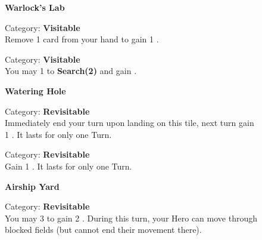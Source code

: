 \begin{figure}[H]
  \begin{minipage}[t]{0.47\textwidth}
    \vspace{0pt}
    \centering
    \textbf{Warlock's Lab}\par
    \caption{\small Category: \textbf{Visitable}\\Remove 1 card from your hand to gain 1 .}
  \end{minipage}\hfill
  \begin{minipage}[t]{0.47\textwidth}
    \vspace{0pt}
    \centering
    \phantom{j}\par
    \caption{\small Category: \textbf{Visitable}\\You may
       1  to \textbf{Search(2)}  and gain .
    }
  \end{minipage}
\end{figure}

\begin{figure}[H]
  \begin{minipage}[t]{0.47\textwidth}
    \vspace{0pt}
    \centering
    \phantom{j}\textbf{Watering Hole}\par
    \caption{\small Category: \textbf{Revisitable}\\
      Immediately end your turn upon landing on this tile, next turn gain 1 .
      It lasts for only one Turn.
    }
  \end{minipage}\hfill
  \begin{minipage}[t]{0.47\textwidth}
    \vspace{0pt}
    \centering
    \par
    \caption{\small Category: \textbf{Revisitable}\\
      Gain 1 .
      It lasts for only one Turn.
    }
  \end{minipage}
\end{figure}

\begin{figure}[H]
  \begin{minipage}[t]{0.47\textwidth}
    \vspace{0pt}
    \centering
    \textbf{Airship Yard}\par
    \caption{\small Category: \textbf{Revisitable}\\You may
       3  to gain 2 .
    During this turn, your Hero can move through blocked fields (but cannot end their movement there).}
  \end{minipage}\hfill
\end{figure}
